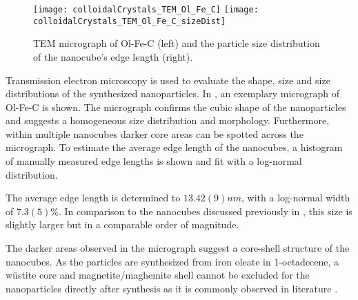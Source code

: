 \documentclass[\main/dresen_thesis.tex]{subfiles}
\begin{document}
  \label{sec:colloidalCrystals:nanoparticle:tem}
  \begin{figure}[!htbp]
    \centering
    \texttt{[image: colloidalCrystals\_TEM\_Ol\_Fe\_C]}
    \texttt{[image: colloidalCrystals\_TEM\_Ol\_Fe\_C\_sizeDist]}
    \caption{\label{fig:colloidalCrystals:nanoparticle:tem}TEM micrograph of Ol-Fe-C (left) and the particle size distribution of the nanocube's edge length (right).}
  \end{figure}

  Transmission electron microscopy is used to evaluate the shape, size and size distributions of the synthesized nanoparticles.
  In , an exemplary micrograph of Ol-Fe-C is shown.
  The micrograph confirms the cubic shape of the nanoparticles and suggests a homogeneous size distribution and morphology.
  Furthermore, within multiple nanocubes darker core areas can be spotted across the micrograph.
  To estimate the average edge length of the nanocubes, a histogram of manually measured edge lengths is shown and fit with a log-normal distribution.

  The average edge length is determined to $13.42(9) \unit{nm}$, with a log-normal width of $7.3(5) \unit{\%}$.
  In comparison to the nanocubes discussed previously in , this size is slightly larger but in a comparable order of magnitude.

  The darker areas observed in the micrograph suggest a core-shell structure of the nanocubes.
  As the particles are synthesized from iron oleate in 1-octadecene, a w\"ustite core and magnetite/maghemite shell cannot be excluded for the nanoparticles directly after synthesis as it is commonly observed in literature \cite{Wetterskog_2013_Anoma}.
\end{document}
